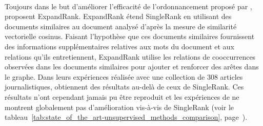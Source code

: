         ~\\Toujours dans le but d'améliorer l'efficacité de l'ordonnancement
        proposé par , 
        proposent ExpandRank. ExpandRank étend SingleRank en utilisant des
        documents similaires au document analysé d'après la mesure de similarité
        vectorielle cosinus. Faisant l'hypothèse que ces documents similaires
        fournissent des informations supplémentaires relatives aux mots du
        document et aux relations qu'ils entretiennent, ExpandRank utilise les
        relations de cooccurrences observées dans les documents similaires pour
        ajouter et renforcer des arêtes dans le graphe. Dans leurs expériences
        réalisée avec une collection de 308 articles journalistiques,
         obtiennent des résultats au-delà de ceux de
        SingleRank. Ces résultats n'ont cependant jamais pu être reproduit et
        les expériences de  ne montrent
        globalement pas d'amélioration vis-à-vis de SingleRank (voir le
        tableau~\ref{tab:state_of_the_art-unsupervised_methods_comparison},
        page~\pageref{tab:state_of_the_art-unsupervised_methods_comparison}).


